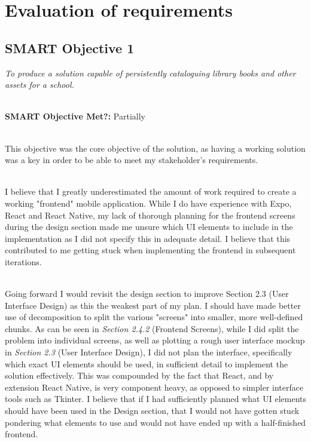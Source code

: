 \documentclass[../main.tex]{subfiles}
\begin{document}
\section{Evaluation of requirements}

\subsection{SMART Objective 1}

\textit{To produce a solution capable of persistently cataloguing
    library books and other assets for a school.}

\noindent \\ \textbf{SMART Objective Met?:} Partially

\begin{comment}
1. Describe what objective was
2. Justify with tests
3. Summary if you feel it did it.
\end{comment}

\noindent \\ This objective was the core objective of the solution,
as having a working solution was a key in order to be able to meet
my stakeholder's requirements.


\noindent \\ I believe that I greatly underestimated the amount of work required
to create a working "frontend" mobile application. While I do have
experience with Expo, React and React Native, my lack of thorough planning
for the frontend screens during the design section made me unsure which UI elements
to include in the implementation as I did not specify this in adequate detail.
I believe that this contributed to me getting stuck when implementing the frontend in
subsequent iterations.

\noindent \\ Going forward I would revisit the design section to improve Section 2.3
(User Interface Design) as this the weakest part of my plan. I should have made better use
of decomposition to split the various "screens" into smaller, more well-defined chunks.
As can be seen in \textit{Section 2.4.2} (Frontend Screens), while I did split the problem
into individual screens, as well as plotting a rough user interface mockup in
\textit{Section 2.3} (User Interface Design), I did not plan the interface, specifically
which exact UI elements should be used, in sufficient detail to implement the solution
effectively. This was compounded by the fact that React, and by extension React Native,
is very component heavy, as opposed to simpler interface tools such as Tkinter.
I believe that if I had sufficiently planned what UI elements should have been used
in the Design section, that I would not have gotten stuck pondering what elements to use
and would not have ended up with a half-finished frontend.
\end{document}
